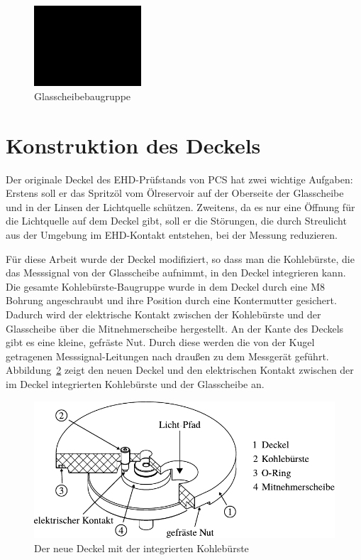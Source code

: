 \begin{figure}[htb]
    \centering
    \includegraphics[width=4cm]{./images/blank_img.jpg}
    \caption{Glasscheibebaugruppe}
    \label{fig:glasscheibebaugruppe}
\end{figure}

\section{Konstruktion des Deckels}
\label{sec:konstruktion_des_deckels}

Der originale Deckel des EHD-Prüfstands von PCS hat zwei wichtige Aufgaben:
Erstens soll er das Spritzöl vom Ölreservoir auf der Oberseite der Glasscheibe und in der Linsen der Lichtquelle schützen.
Zweitens, da es nur eine Öffnung für die Lichtquelle auf dem Deckel gibt, soll er die Störungen, die durch Streulicht aus der Umgebung im EHD-Kontakt entstehen, bei der Messung reduzieren.

Für diese Arbeit wurde der Deckel modifiziert, so dass man die Kohlebürste, die das Messsignal von der Glasscheibe aufnimmt, in den Deckel integrieren kann.
Die gesamte Kohlebürste-Baugruppe wurde in dem Deckel durch eine M8 Bohrung angeschraubt und ihre Position durch eine Kontermutter gesichert.
Dadurch wird der elektrische Kontakt zwischen der Kohlebürste und der Glasscheibe über die Mitnehmerscheibe hergestellt.
An der Kante des Deckels gibt es eine kleine, gefräste Nut.
Durch diese werden die von der Kugel getragenen Messsignal-Leitungen nach draußen zu dem Messgerät geführt.
Abbildung~\ref{fig:deckel_mit_kohlebuersten} zeigt den neuen Deckel und den elektrischen Kontakt zwischen der im Deckel integrierten Kohlebürste und der Glasscheibe an.

\begin{figure}[htb]
    \centering
    \includegraphics[]{./images/deckel_und_scheibe.pdf}
    \caption{Der neue Deckel mit der integrierten Kohlebürste}
    \label{fig:deckel_mit_kohlebuersten}
\end{figure}
